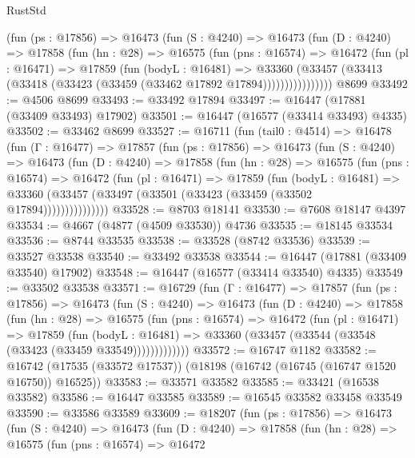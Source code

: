 \begin{lexlean}{RustStd}
\begin{coremodule}
{\begin{coremodule}
{{{{{{{{{{{{{{{{{{{{{{{{{{{{{{{{{{{{{{{{{{{{{{{{{{{{{{{          (fun (ps : @17856) =>
          @16473
            (fun (S : @4240) =>
            @16473
              (fun (D : @4240) =>
              @17858
                (fun (hn : @28) =>
                @16575
                  (fun (pns : @16574) =>
                  @16472
                    (fun (pl : @16471) =>
                    @17859
                      (fun (bodyL : @16481) =>
                      @33360
                        (@33457
                          (@33413 (@33418 (@33423 (@33459 (@33462 @17892 @17894))))))))))))))))
    @8699
@33492 := @4506 @8699
@33493 := @33492 @17894
@33497 := @16447 (@17881 (@33409 @33493) @17902)
@33501 := @16447 (@16577 (@33414 @33493) @4335)
@33502 := @33462 @8699
@33527 := @16711
    (fun (tail0 : @4514) =>
    @16478
      (fun (Γ : @16477) =>
      @17857
        (fun (ps : @17856) =>
        @16473
          (fun (S : @4240) =>
          @16473
            (fun (D : @4240) =>
            @17858
              (fun (hn : @28) =>
              @16575
                (fun (pns : @16574) =>
                @16472
                  (fun (pl : @16471) =>
                  @17859
                    (fun (bodyL : @16481) =>
                    @33360 (@33457 (@33497 (@33501 (@33423 (@33459 (@33502 @17894)))))))))))))))
@33528 := @8703 @18141
@33530 := @7608 @18147 @4397
@33534 := @4667 (@4877 (@4509 @33530)) @4736
@33535 := @18145 @33534
@33536 := @8744 @33535
@33538 := @33528 (@8742 @33536)
@33539 := @33527 @33538
@33540 := @33492 @33538
@33544 := @16447 (@17881 (@33409 @33540) @17902)
@33548 := @16447 (@16577 (@33414 @33540) @4335)
@33549 := @33502 @33538
@33571 := @16729
    (fun (Γ : @16477) =>
    @17857
      (fun (ps : @17856) =>
      @16473
        (fun (S : @4240) =>
        @16473
          (fun (D : @4240) =>
          @17858
            (fun (hn : @28) =>
            @16575
              (fun (pns : @16574) =>
              @16472
                (fun (pl : @16471) =>
                @17859
                  (fun (bodyL : @16481) =>
                  @33360 (@33457 (@33544 (@33548 (@33423 (@33459 @33549)))))))))))))
@33572 := @16747 @1182
@33582 := @16742 (@17535 (@33572 @17537)) (@18198 (@16742 (@16745 (@16747 @1520 @16750)) @16525))
@33583 := @33571 @33582
@33585 := @33421 (@16538 @33582)
@33586 := @16447 @33585
@33589 := @16545 @33582 @33458 @33549
@33590 := @33586 @33589
@33609 := @18207
    (fun (ps : @17856) =>
    @16473
      (fun (S : @4240) =>
      @16473
        (fun (D : @4240) =>
        @17858
          (fun (hn : @28) =>
          @16575
            (fun (pns : @16574) =>
            @16472
}}}}}}}}}}}}}}}}}}}}}}}}}}}}}}}}}}}}}}}}}}}}}}}}}}}}}}}
\end{coremodule}}
\end{coremodule}
\end{lexlean}
